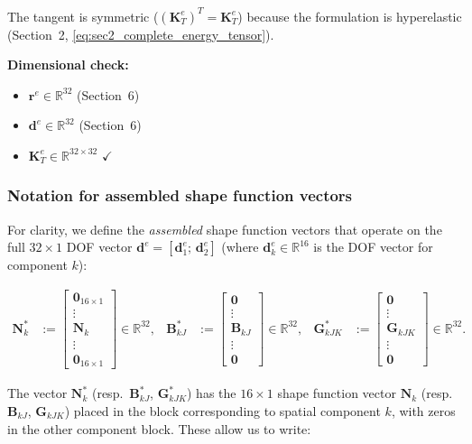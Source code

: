 \documentclass[11pt]{article}
\begin{document}
The tangent is symmetric ($(\mathbf{K}_{T}^{e})^{T}=\mathbf{K}_{T}^{e}$)
because the formulation is hyperelastic
(Section~2, \eqref{eq:sec2_complete_energy_tensor}).

\textbf{Dimensional check:}
\begin{itemize}
\item $\mathbf{r}^{e} \in \mathbb{R}^{32}$ (Section~6)
\item $\mathbf{d}^{e} \in \mathbb{R}^{32}$ (Section~6)
\item $\mathbf{K}_{T}^{e} \in \mathbb{R}^{32 \times 32}$ $\checkmark$
\end{itemize}

\subsubsection{Notation for assembled shape function vectors}

For clarity, we define the \emph{assembled} shape function vectors
that operate on the full $32\times 1$ DOF vector
$\mathbf{d}^{e} = [\mathbf{d}_{1}^{e};\,\mathbf{d}_{2}^{e}]$
(where $\mathbf{d}_{k}^{e}\in\mathbb{R}^{16}$ is the DOF vector for
component $k$):

\begin{align}
\mathbf{N}_{k}^{*} &:= \begin{bmatrix} \mathbf{0}_{16\times 1} \\ \vdots \\ \mathbf{N}_{k} \\ \vdots \\ \mathbf{0}_{16\times 1} \end{bmatrix}
\in \mathbb{R}^{32},
&
\mathbf{B}_{kJ}^{*} &:= \begin{bmatrix} \mathbf{0} \\ \vdots \\ \mathbf{B}_{kJ} \\ \vdots \\ \mathbf{0} \end{bmatrix}
\in \mathbb{R}^{32},
&
\mathbf{G}_{kJK}^{*} &:= \begin{bmatrix} \mathbf{0} \\ \vdots \\ \mathbf{G}_{kJK} \\ \vdots \\ \mathbf{0} \end{bmatrix}
\in \mathbb{R}^{32}.
\label{s7:assembled_SF}
\end{align}

The vector $\mathbf{N}_{k}^{*}$ (resp.\ $\mathbf{B}_{kJ}^{*}$,
$\mathbf{G}_{kJK}^{*}$) has the $16\times 1$ shape function vector
$\mathbf{N}_{k}$ (resp.\ $\mathbf{B}_{kJ}$, $\mathbf{G}_{kJK}$) placed
in the block corresponding to spatial component $k$, with zeros in the
other component block. These allow us to write:
\end{document}
